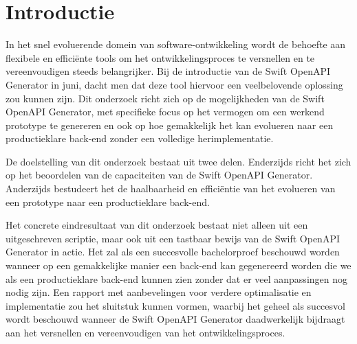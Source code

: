 
\section{Introductie}%
\label{sec:introductie}
In het snel evoluerende domein van software-ontwikkeling wordt de behoefte aan flexibele en efficiënte tools om het ontwikkelingsproces te versnellen en te vereenvoudigen steeds belangrijker. Bij de introductie van de Swift OpenAPI Generator in juni, dacht men dat deze tool hiervoor een veelbelovende oplossing zou kunnen zijn. Dit onderzoek richt zich op de mogelijkheden van de Swift OpenAPI Generator, met specifieke focus op het vermogen om een werkend prototype te genereren en ook op hoe gemakkelijk het kan evolueren naar een productieklare back-end zonder een volledige herimplementatie. 

De doelstelling van dit onderzoek bestaat uit twee delen. Enderzijds richt het zich op het beoordelen van de capaciteiten van de Swift OpenAPI Generator. Anderzijds bestudeert het de haalbaarheid en efficiëntie van het evolueren van een prototype naar een productieklare back-end. 

Het concrete eindresultaat van dit onderzoek bestaat niet alleen uit een uitgeschreven scriptie, maar ook uit een tastbaar bewijs van de Swift OpenAPI Generator in actie. Het zal als een succesvolle bachelorproef beschouwd worden wanneer op een gemakkelijke manier een back-end kan gegenereerd worden die we als een productieklare back-end kunnen zien zonder dat er veel aanpassingen nog nodig zijn. Een rapport met aanbevelingen voor verdere optimalisatie en implementatie zou het sluitstuk kunnen vormen, waarbij het geheel als succesvol wordt beschouwd wanneer de Swift OpenAPI Generator daadwerkelijk bijdraagt aan het versnellen en vereenvoudigen van het ontwikkelingsproces.  


